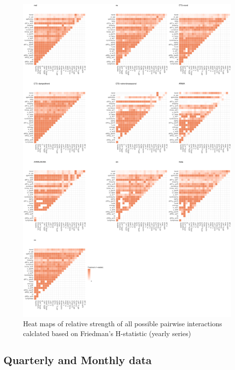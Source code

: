 \documentclass[11pt,a4paper,]{article}
\begin{document}
\begin{figure}
\centering
\includegraphics{figures/friedmany-1.pdf}
\caption{\label{fig:friedmany}Heat maps of relative strength of all possible
pairwise interactions calclated based on Friedman's H-statistic (yearly
series)}
\end{figure}

\newpage

\subsection{Quarterly and Monthly
data}\label{quarterly-and-monthly-data}
\end{document}
